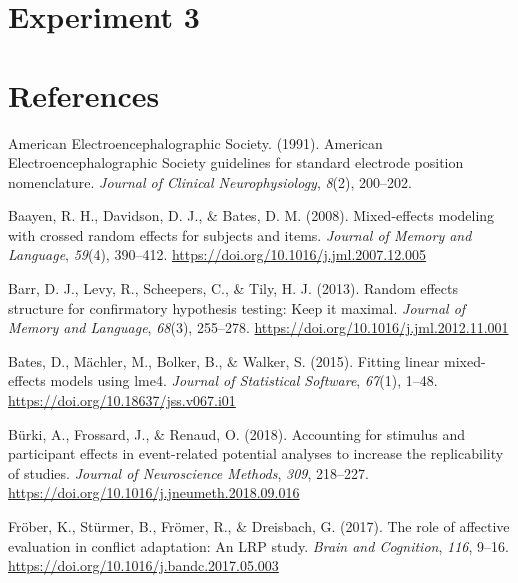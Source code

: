 \documentclass[
  english,
  man,11pt,floatsintext]{apa7}
\newlength{\cslhangindent}
\newenvironment{cslreferences}%
  {\setlength{\parindent}{0pt}%
  \everypar{\setlength{\hangindent}{\cslhangindent}}\ignorespaces}%
  {\par}
\begin{document}
\hypertarget{experiment-3}{%
\section{Experiment 3}\label{experiment-3}}

\newpage

\hypertarget{references}{%
\section{References}\label{references}}

\begingroup
\setlength{\parindent}{-0.5in}
\setlength{\leftskip}{0.5in}

\hypertarget{refs}{}
\begin{cslreferences}
\leavevmode\hypertarget{ref-americanelectroencephalographicsociety1991}{}%
American Electroencephalographic Society. (1991). American Electroencephalographic Society guidelines for standard electrode position nomenclature. \emph{Journal of Clinical Neurophysiology}, \emph{8}(2), 200--202.

\leavevmode\hypertarget{ref-baayen2008}{}%
Baayen, R. H., Davidson, D. J., \& Bates, D. M. (2008). Mixed-effects modeling with crossed random effects for subjects and items. \emph{Journal of Memory and Language}, \emph{59}(4), 390--412. \url{https://doi.org/10.1016/j.jml.2007.12.005}

\leavevmode\hypertarget{ref-barr2013}{}%
Barr, D. J., Levy, R., Scheepers, C., \& Tily, H. J. (2013). Random effects structure for confirmatory hypothesis testing: Keep it maximal. \emph{Journal of Memory and Language}, \emph{68}(3), 255--278. \url{https://doi.org/10.1016/j.jml.2012.11.001}

\leavevmode\hypertarget{ref-R-lme4}{}%
Bates, D., Mächler, M., Bolker, B., \& Walker, S. (2015). Fitting linear mixed-effects models using lme4. \emph{Journal of Statistical Software}, \emph{67}(1), 1--48. \url{https://doi.org/10.18637/jss.v067.i01}

\leavevmode\hypertarget{ref-buxfcrki2018}{}%
Bürki, A., Frossard, J., \& Renaud, O. (2018). Accounting for stimulus and participant effects in event-related potential analyses to increase the replicability of studies. \emph{Journal of Neuroscience Methods}, \emph{309}, 218--227. \url{https://doi.org/10.1016/j.jneumeth.2018.09.016}

\leavevmode\hypertarget{ref-fruxf6ber2017}{}%
Fröber, K., Stürmer, B., Frömer, R., \& Dreisbach, G. (2017). The role of affective evaluation in conflict adaptation: An LRP study. \emph{Brain and Cognition}, \emph{116}, 9--16. \url{https://doi.org/10.1016/j.bandc.2017.05.003}


\end{cslreferences}
\end{document}
